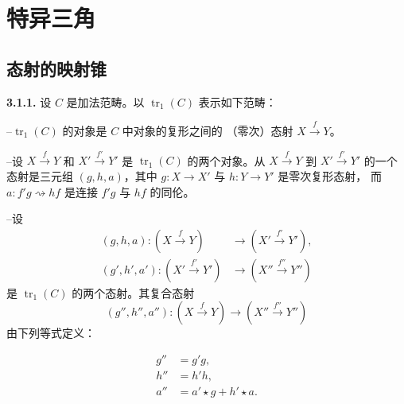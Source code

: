 \clearpage
{}%
\section{特异三角}

\subsection{态射的映射锥}

\noindent\textbf{3.1.1.}\quad
{}
设 $C$ 是加法范畴。以 $\operatorname{tr}_1(C)$ 表示如下范畴：

\noindent--\quad $\operatorname{tr}_1(C)$ 的对象是 $C$ 中对象的复形之间的
（零次）态射 $X\xrightarrow{f}Y$。

\noindent--\quad 设 $X\xrightarrow{f}Y$ 和 $X'\xrightarrow{f'}Y'$ 是
$\operatorname{tr}_1(C)$ 的两个对象。从 $X\xrightarrow{f}Y$ 到
$X'\xrightarrow{f'}Y'$ 的一个态射是三元组 $(g,h,a)$，其中
$g\colon X\longrightarrow X'$ 与 $h\colon Y\longrightarrow Y'$ 是零次复形态射，
而
$a\colon f'g\rightsquigarrow hf$ 是连接 $f'g$ 与 $hf$ 的同伦。

\noindent--\quad 设
\begin{equation*}
  \begin{aligned}
    (g,h,a)\colon (X\xrightarrow{f}Y)
      &\longrightarrow (X'\xrightarrow{f'}Y'),\\
    (g',h',a')\colon (X'\xrightarrow{f'}Y')
      &\longrightarrow (X''\xrightarrow{f''}Y'')
  \end{aligned}
\end{equation*}
是 $\operatorname{tr}_1(C)$ 的两个态射。其复合态射
\begin{equation*}
  (g'',h'',a'')\colon
  (X\xrightarrow{f}Y)\longrightarrow(X''\xrightarrow{f''}Y'')
\end{equation*}
由下列等式定义：

\begin{equation}
  \begin{aligned}
    g''&=g'g,\\
    h''&=h'h,\\
    a''&=a'\star g+h'\star a.
  \end{aligned}
  \tag{3.1.1.1}
\end{equation}

